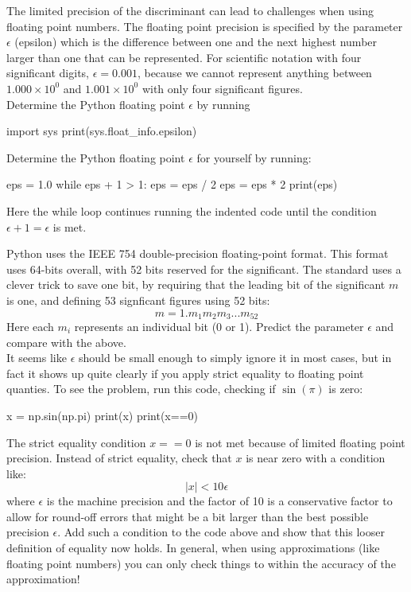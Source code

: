 The limited precision of the discriminant can lead to challenges when
using floating point numbers.  The floating point precision is
specified by the parameter $\epsilon$ (epsilon) which is the
difference between one and the next highest number larger than one
that can be represented.  For scientific notation with four
significant digits, $\epsilon=0.001$, because we cannot represent
anything between $1.000 \times 10^0$ and $1.001 \times 10^0$ with only
four significant figures. \\

\plot Determine the Python floating point $\epsilon$ by running
\begin{python}
import sys
print(sys.float_info.epsilon)
\end{python}

\vskip 0.25cm
\begin{plot} \end{plot} Determine the Python floating point $\epsilon$ for yourself by running:
\begin{python}
eps = 1.0
while eps + 1 > 1:
    eps = eps / 2
eps = eps * 2
print(eps)
\end{python}
Here the while loop continues running the indented code until the
condition $\epsilon+1=\epsilon$ is met.

\newpage
\vskip 0.25cm
\plot Python uses the IEEE 754 double-precision
floating-point format.  This format uses 64-bits overall, with 52 bits
reserved for the significant.  The standard uses a clever trick to
save one bit, by requiring that the leading bit of the significant $m$ is
one, and defining 53 signficant figures using 52 bits:
\begin{displaymath}
m = 1.m_1 m_2 m_3 ... m_{52}
\end{displaymath}
Here each $m_i$ represents an individual bit (0 or 1).  Predict the
parameter $\epsilon$ and compare with the above. \\


\plot It seems like $\epsilon$ should be small enough to simply ignore
it in most cases, but in fact it shows up quite clearly if you apply
strict equality to floating point quanties.  To see the problem, run
this code, checking if $\sin(\pi)$ is zero:
\begin{python}
x = np.sin(np.pi)
print(x)
print(x==0)
\end{python}
The strict equality condition $x==0$ is not met because of limited
floating point precision.  Instead of strict equality, check that $x$
is near zero with a condition like:
\begin{displaymath}
|x| < 10 \epsilon
\end{displaymath}
where $\epsilon$ is the machine precision and the factor of 10 is a
conservative factor to allow for round-off errors that might be a bit
larger than the best possible precision $\epsilon$.  Add such a
condition to the code above and show that this looser definition of
equality now holds.  In general, when using approximations (like
floating point numbers) you can only check things to within the
accuracy of the approximation!\\

